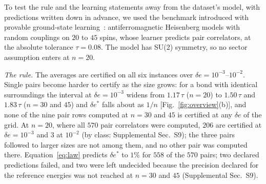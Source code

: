 \documentclass[aps,prx,twocolumn,10pt,superscriptaddress,nofootinbib,longbibliography,floatfix]{revtex4-2}
\theoremstyle{remark}
\newcommand{\de}{\delta e}
\newcommand{\des}{\delta e^{*}}
\begin{document}
To test the rule and the learning statements away from the dataset's model, with predictions written down in
advance, we used the benchmark introduced with provable ground-state learning~\cite{huang2022}: antiferromagnetic
Heisenberg models with random couplings on $20$ to $45$ spins, whose learner predicts pair correlators, at the %
absolute tolerance $\tau=0.08$. The model has SU(2) symmetry, so no sector assumption enters at $n=20$. %

\emph{The rule.} The averages are certified on all six instances over $\de=10^{-3}$--$10^{-2}$. Single pairs become %
harder to certify as the size grows: for a bond with identical surroundings the interval at $\de=10^{-3}$ widens %
from $1.17\,\tau$ ($n=20$) to $1.50\,\tau$ and $1.83\,\tau$ ($n=30$ and $45$) and $\des$ falls about as $1/n$ %
[Fig.~\ref{fig:overview}(b)], and none of the nine pair rows computed at $n=30$ and $45$ is certified at any $\de$ %
of the grid. At $n=20$, where all $570$ pair correlators were computed, $206$ are certified at $\de=10^{-3}$ %
and $3$ at $10^{-2}$ (by class: Supplemental Sec.~S9); the three pairs followed to larger %
sizes are not among them, and no other pair was computed there. Equation~\eqref{eq:law} predicts $\des$ to $1\%$ %
for $558$ of the $570$ pairs; two declared predictions failed, and two were left undecided because the precision %
declared for the reference energies was not reached at $n=30$ and $45$ (Supplemental Sec.~S9). %
\end{document}
